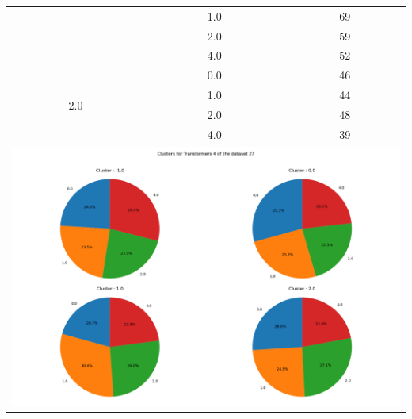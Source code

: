 \begin{longtable}{|c|c|c|c|c|}
& \multicolumn{2}{c|}{1.0} & \multicolumn{2}{c|}{69} \\
& \multicolumn{2}{c|}{2.0} & \multicolumn{2}{c|}{59} \\
& \multicolumn{2}{c|}{4.0} & \multicolumn{2}{c|}{52} \\
\hline
\multirow{4}{*}{2.0} & \multicolumn{2}{c|}{0.0} & \multicolumn{2}{c|}{46} \\
& \multicolumn{2}{c|}{1.0} & \multicolumn{2}{c|}{44} \\
& \multicolumn{2}{c|}{2.0} & \multicolumn{2}{c|}{48} \\
& \multicolumn{2}{c|}{4.0} & \multicolumn{2}{c|}{39} \\
\hline
\multicolumn{5}{|c|}{\includegraphics[width=0.8\linewidth]{img/annexes/27/clustering_pie_charts/Transformers 4.png}} \\
\end{longtable}


